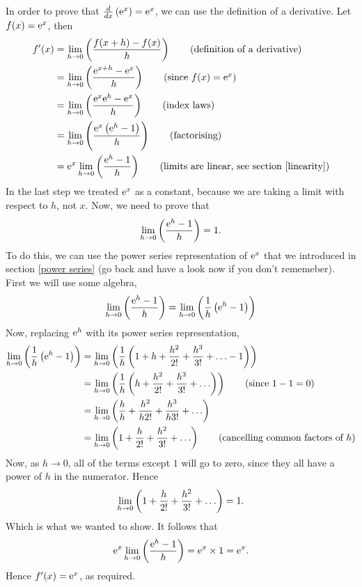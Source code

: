   	\bigskip
	
	\hfil{}
	\bigskip
	\bigskip

\noindent In order to prove that $\frac{d}{dx}\left(\mathrm{e}^x\right) = \mathrm{e}^x$, we can use the definition of a derivative. Let $f(x) = \mathrm{e}^x$, then
\begin{align*}
f'(x)  & = \lim_{h \rightarrow 0}\brac{\frac{f(x + h) - f(x)}{h}} \tag{definition of a derivative} \\
	& = \lim_{h \rightarrow 0}\brac{\frac{\e^{x + h} - \e^x}{h}} \tag{since $f(x) = \e^x$}\\
	& = \lim_{h \rightarrow 0}\brac{\frac{\e^{x}\e^{h} - \e^x}{h}} \tag{index laws} \\
	& = \lim_{h \rightarrow 0}\brac{\frac{\e^{x}\brac{\e^{h} - 1}}{h}} \tag{factorising} \\
	& = \e^{x}\lim_{h \rightarrow 0}\brac{\frac{\e^{h} - 1}{h}} \tag{limits are linear, see section \ref{linearity}}
\end{align*}
In the last step we treated $\mathrm{e}^x$ as a constant, because we are taking a limit with respect to $h$, not $x$. Now, we need to prove that
\[
\lim_{h \rightarrow 0}\left(\frac{\mathrm{e}^{h} - 1}{h}\right) = 1.
\]
To do this, we can use the power series representation of $\mathrm{e}^x$ that we introduced in section \ref{power series} (go back and have a look now if you don't rememeber). First we will use some algebra,
\[
\lim_{h \rightarrow 0}\left(\frac{\mathrm{e}^{h} - 1}{h}\right) = \lim_{h \rightarrow 0}\left(\frac{1}{h}\left(\mathrm{e}^{h} - 1\right)\right) 
\]
Now, replacing $\mathrm{e}^h$ with its power series representation,
\begin{align*}
\lim_{h \rightarrow 0}\left(\frac{1}{h}\left(\mathrm{e}^{h} - 1\right)\right) & = \lim_{h \rightarrow 0}\left(\frac{1}{h}\left(1 + h + \frac{h^2}{2!} +  \frac{h^3}{3!} + \ldots  - 1\right)\right) \\
		& = \lim_{h \rightarrow 0}\left(\frac{1}{h}\left(h + \frac{h^2}{2!} +  \frac{h^3}{3!} + \ldots\right)\right) \tag{since $1-1 = 0$} \\
		& =  \lim_{h \rightarrow 0}\left(\frac{h}{h} + \frac{h^2}{h2!} +  \frac{h^3}{h3!} + \ldots\right) \\
		& = \lim_{h \rightarrow 0}\left(1 + \frac{h}{2!} +  \frac{h^2}{3!} + \ldots\right) \tag{cancelling common factors of $h$}
\end{align*}
Now, as $h \rightarrow 0$, all of the terms except $1$ will go to zero, since they all have a power of $h$ in the numerator. Hence
\[
 \lim_{h \rightarrow 0}\left(1 + \frac{h}{2!} +  \frac{h^2}{3!} + \ldots\right) = 1.
\]
Which is what we wanted to show. It follows that
\[
\mathrm{e}^{x}\lim_{h \rightarrow 0}\left(\frac{\mathrm{e}^{h} - 1}{h}\right) = \mathrm{e}^x \times 1 = \mathrm{e}^x.
\]
Hence $f'(x) = \mathrm{e}^x$, as required.

